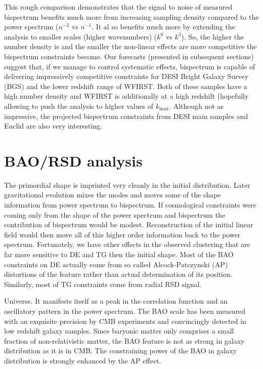 This rough comparison demonstrates that the signal to noise of measured
bispectrum benefits much more from increasing sampling density  compared to
the power spectrum ($n^{-2}$ vs $n^{-1}$. It al so benefits much more by
extending the analysis to smaller scales (higher wavenumbers) ($k^6$ vs
$k^3$). So, the higher the number density is and the smaller the non-linear
effects are more competitive the bispectrum constraints become. Our forecasts
(presented in subsequent sections) suggest that, if we manage to control
systematic effects, bispectrum is capable of delivering impressively
competitive constraints for DESI Bright Galaxy Survey (BGS) and the lower
redshift range of WFIRST. Both of these samples have a high number density and
WFIRST is additionally at a high redshift (hopefully allowing to push the
analysis to higher values of $k_\mathrm{max}$. Although not as impressive, the
projected bispectrum constraints from DESI main samples and Euclid are also
very interesting.

\section{BAO/RSD analysis}

The primordial shape is imprinted very cleanly in the initial distribution.
Later gravitational evolution mixes the modes and moves some of the shape
information from power spectrum to bispectrum. If cosmological constraints
were coming only from the shape of the power spectrum and bispectrum the
contribution of bispectrum  would be modest. Reconstruction of the initial
linear field would then move all of this higher order information back to the
power spectrum. Fortunately, we have other effects in the observed clustering
that are far more sensitive to DE and TG then the initial shape. Most of the
BAO constraints on DE actually come from so called Alcock-Patczynski (AP)
distortions of the feature rather than actual determination of its position.
Similarly, most of TG constraints come from radial RSD signal.

Universe. It manifests itself as a peak in the correlation function and an
oscillatory pattern in the power spectrum. The BAO scale has been measured
with an exquisite precision by CMB experiments and convincingly detected in
low redshift galaxy samples. Since baryonic matter only comprises a small
fraction of non-relativistic matter, the BAO feature is not as strong in
galaxy distribution as it is in CMB. The constraining power of the BAO in
galaxy distribution is strongly enhanced by the AP effect.

